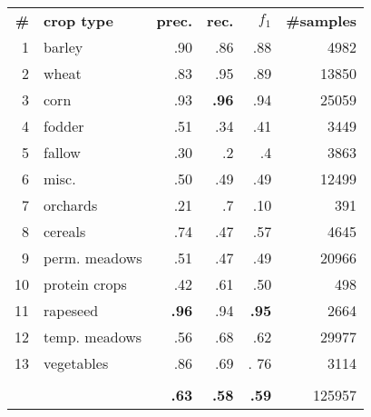 \begin{tabular}{rlrrrr}
\toprule
\textbf{\#} & \textbf{crop type} &  \textbf{prec.} & \textbf{rec.} & \textbf{$f_1$} & \textbf{\#samples} \\
\cmidrule(lr){1-1}\cmidrule(lr){2-2}\cmidrule(lr){3-3}\cmidrule(lr){4-4}\cmidrule(lr){5-5}\cmidrule(lr){6-6}
1 & barley &         .90 &          .86 &          .88 &     4982 \\
2 & wheat &         .83 &          .95 &          .89 &    13850 \\
3 & corn &         .93 &          \textbf{.96} &          .94 &    25059 \\
4 & fodder &         .51 &          .34 &          .41 &     3449 \\
5 & fallow &         .30 &           .2 &           .4 &     3863 \\
6 & misc. &         .50 &          .49 &          .49 &    12499 \\
7 & orchards &         .21 &           .7 &          .10 &      391 \\
8 & cereals &         .74 &          .47 &          .57 &     4645 \\
9 & perm. meadows &         .51 &          .47 &          .49 &    20966 \\
10 & protein crops &         .42 &          .61 &          .50 &      498 \\
11 & rapeseed &         \textbf{.96} &          .94 &          \textbf{.95} &     2664 \\
12 & temp. meadows &         .56 &          .68 &          .62 &    29977 \\
13 & vegetables &         .86 &          .69 &         . 76 &     3114 \\
   &                       &            &             &             &          \\
   &                       &         \textbf{.63} &          \textbf{.58} &          \textbf{.59} &   125957 \\
\bottomrule
\end{tabular}

